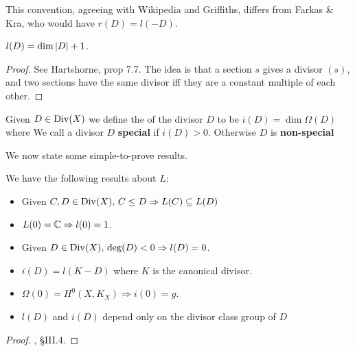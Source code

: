 \documentclass{article}
\begin{document}
\begin{remark}
	This convention, agreeing with Wikipedia and Griffiths, differs from Farkas \& Kra, who would have $r(D) = l(-D)$. 
\end{remark}

\begin{lemma}
	$l(D) = \dim \left\lvert D \right\rvert+1$. 
\end{lemma}
\begin{proof}
	See Hartshorne, prop 7.7. The idea is that a section $s$ gives a divisor $(s)$, and two sections have the same divisor iff they are a constant multiple of each other. 
\end{proof}

\begin{definition}
	Given $D \in \operatorname{Div}(X)$ we define the  of the divisor $D$ to be $i(D) = \dim \Omega(D)$ where
We call a divisor $D$ \textbf{special} if $i(D)>0$. Otherwise $D$ is \textbf{non-special}
\end{definition}

We now state some simple-to-prove results.
\begin{prop}\label{prop: properties of l(D) and i(D)}
	We have the following results about $L$:
	\begin{itemize}
		\item Given $C,D \in \operatorname{Div}(X), \, C \leq D \Rightarrow L(C) \subseteq L(D)$
		\item $L(0) = \mathbb{C} \Rightarrow l(0) = 1$. 
		\item Given $D \in \operatorname{Div}(X), \, \deg(D)<0 \Rightarrow l(D) = 0$. 
		\item $i(D) = l(K-D)$ where $K$ is the canonical divisor.
		\item $\Omega(0) = H^0(X,K_X) \Rightarrow i(0) = g$. 
		\item $l(D)$ and $i(D)$ depend only on the divisor class group of $D$
	\end{itemize}
\end{prop}
\begin{proof}
\cite{Farkas1992}, \S III.4.
\end{proof}
\end{document}
